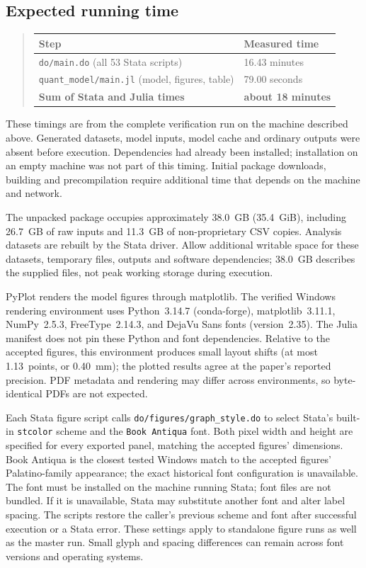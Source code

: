 \documentclass[11pt]{article}
\newcommand{\pkgfile}[1]{\nolinkurl{#1}}
\begin{document}
\subsection*{Expected running time}

\begin{quote}
\begin{tabular}{@{}ll@{}}
\toprule
\textbf{Step} & \textbf{Measured time}\\
\midrule
\pkgfile{do/main.do} (all 53 Stata scripts) & 16.43 minutes\\
\pkgfile{quant_model/main.jl} (model, figures, table) & 79.00 seconds\\
\addlinespace
\textbf{Sum of Stata and Julia times} & \textbf{about 18 minutes}\\
\bottomrule
\end{tabular}
\end{quote}

\noindent These timings are from the complete verification run on the
machine described above. Generated datasets, model inputs, model cache
and ordinary outputs were absent before execution. Dependencies had
already been installed; installation on an empty machine was not part
of this timing. Initial package downloads, building and precompilation
require additional time that depends on the machine and network.

The unpacked package occupies approximately 38.0~GB (35.4~GiB), including
26.7~GB of raw inputs and 11.3~GB of non-proprietary CSV copies.
Analysis datasets are rebuilt by the Stata driver. Allow additional
writable space for these datasets, temporary files, outputs and software
dependencies; 38.0~GB describes the supplied files, not peak working
storage during execution.

PyPlot renders the model figures through matplotlib. The verified Windows
rendering environment uses Python~3.14.7 (conda-forge), matplotlib~3.11.1,
NumPy~2.5.3, FreeType~2.14.3, and DejaVu Sans fonts (version~2.35).
The Julia manifest does not pin these Python and font dependencies.
Relative to the accepted figures, this environment produces small layout
shifts (at most 1.13~points, or 0.40~mm); the plotted results agree at the
paper's reported precision. PDF metadata and rendering may differ across
environments, so byte-identical PDFs are not expected.

Each Stata figure script calls \pkgfile{do/figures/graph_style.do} to select
Stata's built-in \texttt{stcolor} scheme and the \texttt{Book Antiqua}
font. Both pixel width and height are specified for every exported panel,
matching the accepted figures' dimensions. Book Antiqua is the closest
tested Windows match to the accepted figures' Palatino-family appearance;
the exact historical font configuration is unavailable. The font must be
installed on the machine running Stata; font files are not bundled. If it
is unavailable, Stata may substitute another font and alter label spacing.
The scripts restore the caller's previous scheme and font after successful
execution or a Stata error. These settings apply to standalone figure runs
as well as the master run. Small glyph and spacing differences can remain
across font versions and operating systems.
\end{document}
